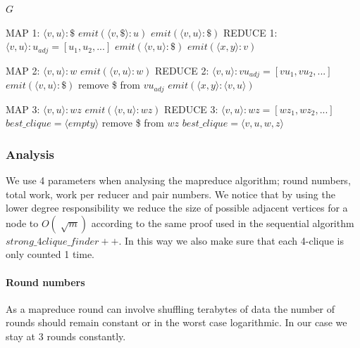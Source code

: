 \documentclass{article}
\begin{document}
\begin{algorithm}
\label{mrAlgorithm}
\caption{$mr\_strong\_4clique\_finder$}
\begin{algorithmic}
\REQUIRE $G$
	
\REQUIRE MAP 1: $\langle v,u\rangle :\$$
		\STATE $emit(\langle v,\$\rangle :u)$
		\STATE $emit(\langle v,u\rangle :\$)$
	\ENDIF
\REQUIRE REDUCE 1: $\langle v,u\rangle :u_{adj} = [u_1,u_2,...]$
		\STATE $emit(\langle v,u\rangle :\$)$
	\ENDIF
				\STATE $emit(\langle x,y\rangle :v)$
			\ENDIF
		\ENDFOR
	\ENDFOR

\REQUIRE MAP 2: $\langle v,u\rangle :w$
	\STATE $emit(\langle v,u\rangle :w)$
\REQUIRE REDUCE 2: $\langle v,u\rangle : vu_{adj} = [vu_1,vu_2,...]$
		\STATE $emit(\langle v,u\rangle : \$)$
		\STATE remove \$ from $vu_{adj}$
	\ENDIF
				\STATE $emit(\langle x,y\rangle :\langle v,u\rangle)$
			\ENDIF
		\ENDFOR
	\ENDFOR

\REQUIRE MAP 3: $\langle v,u\rangle :wz$
	\STATE $emit(\langle v,u\rangle :wz)$
\REQUIRE REDUCE 3: $\langle v,u\rangle :wz = [wz_1,wz_2,...]$
	\STATE $best\_clique = \langle empty\rangle $
	\STATE remove \$ from $wz$
				\STATE $best\_clique = \langle v,u,w,z\rangle$
			\ENDIF
		\ENDFOR
	\ENDIF
\end{algorithmic}
\end{algorithm}

\subsubsection{Analysis}
We use 4 parameters when analysing the mapreduce algorithm; round numbers, total work, work per reducer and pair numbers. We notice that by using the lower degree responsibility we reduce the size of possible adjacent vertices for a node to $O(\sqrt[]{m})$ according to the same proof \cite{AlgorithmicAspects} used in the sequential algorithm $strong\_4clique\_finder++$. In this way we also make sure that each 4-clique is only counted 1 time.

\paragraph{Round numbers}
As a mapreduce round can involve shuffling terabytes of data the number of rounds should remain constant or in the worst case logarithmic. In our case we stay at 3 rounds constantly.
\end{document}
